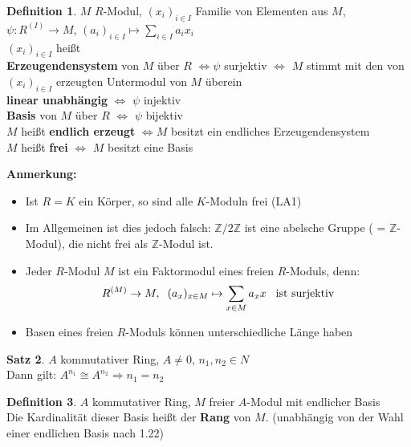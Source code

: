 \documentclass[10pt,a4paper,numbers=endperiod]{scrreprt}
\theoremstyle{definition}
\newtheorem{satz}{Satz}[section]
\newtheorem{defi}[satz]{Definition}
\def\ZZ{{\mathbb Z}}
\begin{document}
\begin{defi}
	$M$ $R$-Modul, $(x_i)_{i \in I}$ Familie von Elementen aus $M$, $\psi: R^{(I)} \rightarrow M$, $(a_i)_{i \in I} \mapsto \sum\limits_{i \in I} a_i x_i$\\
	$(x_i)_{i \in I}$ heißt\\
	\textbf{Erzeugendensystem} von $M$ über $R$ $\Leftrightarrow \psi$ surjektiv $\Leftrightarrow$ $M$ stimmt mit den von $(x_i)_{i \in I}$ erzeugten Untermodul von $M$ überein\\
	\textbf{linear unabhängig} $\Leftrightarrow$ $\psi$ injektiv\\
	\textbf{Basis} von $M$ über $R$ $\Leftrightarrow$ $\psi$ bijektiv\\
	$M$ heißt \textbf{endlich erzeugt} $\Leftrightarrow M$ besitzt ein endliches Erzeugendensystem\\
	$M$ heißt \textbf{frei} $\Leftrightarrow$ $M$ besitzt eine Basis
\end{defi}

\textbf{Anmerkung:} \begin{itemize}
	\item Ist $R = K$ ein Körper, so sind alle $K$-Moduln frei (LA1)
	\item Im Allgemeinen ist dies jedoch falsch: $\ZZ/2 \ZZ$ ist eine abelsche Gruppe ( = $\ZZ$-Modul), die nicht frei als $\ZZ$-Modul ist.
	\item Jeder $R$-Modul $M$ ist ein Faktormodul eines freien $R$-Moduls, denn:
	\begin{align*}
		R^{(M)} \rightarrow M, \hspace{2mm} (a_x)_{x \in M} \mapsto \sum\limits_{x \in M} a_x x \hspace{3mm} \text{ist surjektiv}
	\end{align*}
	\item Basen eines freien $R$-Moduls können unterschiedliche Länge haben
\end{itemize}

\begin{satz}
	$A$ kommutativer Ring, $A \neq 0$, $n_1, n_2 \in N$\\
	Dann gilt: $A^{n_1} \cong A^{n_2} \Rightarrow n_1 = n_2$
\end{satz}

\begin{defi}
	$A$ kommutativer Ring, $M$ freier $A$-Modul mit endlicher Basis\\
	Die Kardinalität dieser Basis heißt der \textbf{Rang} von $M$. (unabhängig von der Wahl einer endlichen Basis nach 1.22)
\end{defi}
\end{document}
